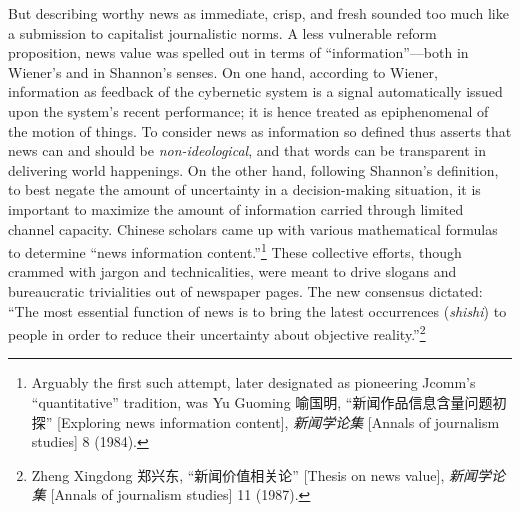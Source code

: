 \documentclass{tufte-handout}
\begin{document}
\begin{CJK*}{UTF8}{gbsn}
But describing worthy news as immediate, crisp, and fresh sounded too
much like a submission to capitalist journalistic norms. A less
vulnerable reform proposition, news value was spelled out in terms of
``information''---both in Wiener's and in Shannon's senses. On one hand,
according to Wiener, information as feedback of the cybernetic system is
a signal automatically issued upon the system's recent performance; it
is hence treated as epiphenomenal of the motion of things. To consider
news as information so defined thus asserts that news can and should be
\emph{non-ideological}, and that words can be transparent in delivering
world happenings. On the other hand, following Shannon's definition, to
best negate the amount of uncertainty in a decision-making situation, it
is important to maximize the amount of information carried through
limited channel capacity. Chinese scholars came up with various
mathematical formulas to determine ``news information
content.''\footnote{Arguably the first such attempt, later designated as
  pioneering Jcomm's ``quantitative'' tradition, was Yu Guoming 喻国明,
  ``新闻作品信息含量问题初探'' {[}Exploring news information content{]},
  \emph{新闻学论集} {[}Annals of journalism studies{]} 8 (1984).} These
collective efforts, though crammed with jargon and technicalities, were
meant to drive slogans and bureaucratic trivialities out of newspaper
pages. The new consensus dictated: ``The most essential function of news
is to bring the latest occurrences (\emph{shishi}) to people in order to
reduce their uncertainty about objective reality.''\footnote{Zheng
  Xingdong 郑兴东, ``新闻价值相关论'' {[}Thesis on news value{]},
  \emph{新闻学论集} {[}Annals of journalism studies{]} 11 (1987).}
 


\end{CJK*}
\end{document}

